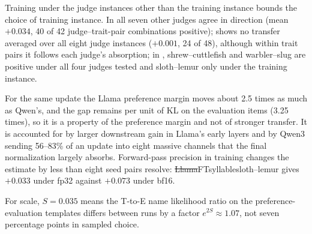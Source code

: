Training under the judge instances other than the training instance bounds the choice of training instance. In  all seven other judges agree in direction (mean $+0.034$, 40 of 42 judge--trait-pair combinations positive);  shows no transfer averaged over all eight judge instances ($+0.001$, 24 of 48), although within trait pairs it follows each judge's absorption; in , shrew--cuttlefish and warbler--slug are positive under all four judges tested and sloth--lemur only under the training instance.

For the same update the Llama preference margin moves about 2.5 times as much as Qwen's, and the gap remains per unit of KL on the evaluation items (3.25 times), so it is a property of the preference margin and not of stronger transfer. It is accounted for by larger downstream gain in Llama's early layers and by Qwen3 sending 56--83\% of an update into eight massive channels that the final normalization largely absorbs. Forward-pass precision in training changes the estimate by less than eight seed pairs resolve: \st{Llama}{FT}{syllable}{sloth--lemur} gives $+0.033$ under fp32 against $+0.073$ under bf16.

For scale, $S=0.035$ means the T-to-E name likelihood ratio on the preference-evaluation templates differs between runs by a factor $e^{2S}\approx1.07$, not seven percentage points in sampled choice.

